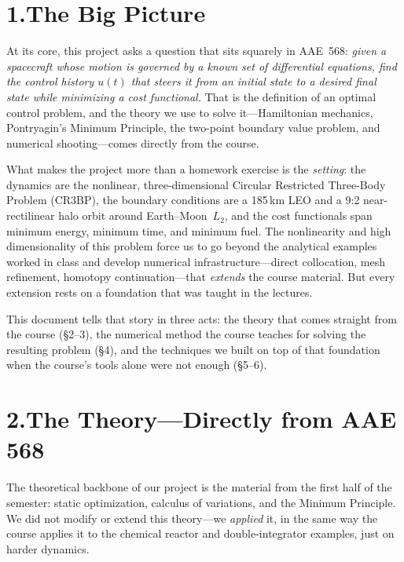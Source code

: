 \documentclass[11pt,letterpaper]{article}
\begin{document}
\section{1.\quad The Big Picture}

At its core, this project asks a question that sits squarely in AAE~568: \emph{given a spacecraft whose motion is governed by a known set of differential equations, find the control history $u(t)$ that steers it from an initial state to a desired final state while minimizing a cost functional.} That is the definition of an optimal control problem, and the theory we use to solve it---Hamiltonian mechanics, Pontryagin's Minimum Principle, the two-point boundary value problem, and numerical shooting---comes directly from the course.

What makes the project more than a homework exercise is the \emph{setting}: the dynamics are the nonlinear, three-dimensional Circular Restricted Three-Body Problem (CR3BP), the boundary conditions are a 185\,km LEO and a 9:2 near-rectilinear halo orbit around Earth--Moon~$L_2$, and the cost functionals span minimum energy, minimum time, and minimum fuel. The nonlinearity and high dimensionality of this problem force us to go beyond the analytical examples worked in class and develop numerical infrastructure---direct collocation, mesh refinement, homotopy continuation---that \emph{extends} the course material. But every extension rests on a foundation that was taught in the lectures.

This document tells that story in three acts: the theory that comes straight from the course (\S2--3), the numerical method the course teaches for solving the resulting problem (\S4), and the techniques we built on top of that foundation when the course's tools alone were not enough (\S5--6).


\section{2.\quad The Theory---Directly from AAE 568}

The theoretical backbone of our project is the material from the first half of the semester: static optimization, calculus of variations, and the Minimum Principle. We did not modify or extend this theory---we \emph{applied} it, in the same way the course applies it to the chemical reactor and double-integrator examples, just on harder dynamics.
\end{document}

